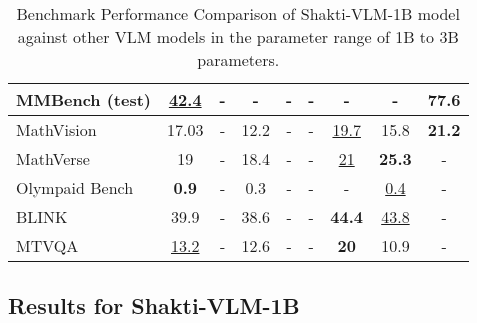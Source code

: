 \documentclass{article}
\begin{document}
\begin{table}
{\begin{tabular}{|l|c|c|c|c|c|c|c|c|}
\hline
MMBench (test) & \underline{42.4} & - & - & - & - & - & - & \textbf{77.6} \\
\hline
MathVision & 17.03 & - & 12.2 & - & - & \underline{19.7} & 15.8 & \textbf{21.2} \\
\hline
MathVerse & 19 & - & 18.4 & - & - & \underline{21} & \textbf{25.3} & - \\
\hline
Olympaid Bench & \textbf{0.9} & - & 0.3 & - & - & - & \underline{0.4} & - \\
\hline
BLINK & 39.9 & - & 38.6 & - & - & \textbf{44.4} & \underline{43.8} & - \\
\hline
MTVQA  & \underline{13.2} & - & 12.6 & - & - & \textbf{20} & 10.9 & - \\
\hline
\end{tabular}%
}
\vspace{0.5cm}
\caption{ Benchmark Performance Comparison of Shakti-VLM-1B model against other VLM models in the parameter range of 1B to 3B parameters.}

\label{table:benchmark-shakti-vlm-1B}
\end{table}




\subsection{Results for Shakti-VLM-1B}
\end{document}
